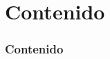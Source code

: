 




    \frame{\titlepage}

    \section*{Contenido}
    \begin{frame}
        \frametitle{Contenido}
        \tableofcontents
    \end{frame}

    
    
    
    
    
